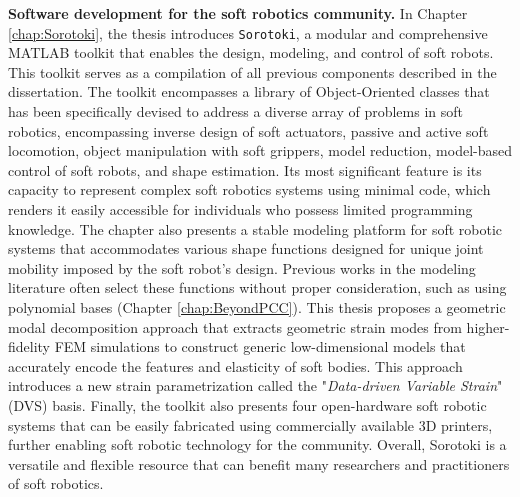 \textbf{Software development for the soft robotics community.} In Chapter \ref{chap:Sorotoki}, the thesis introduces \texttt{Sorotoki}, a modular and comprehensive MATLAB\textsuperscript{\scriptsize\textregistered} toolkit that enables the design, modeling, and control of soft robots. This toolkit serves as a compilation of all previous components described in the dissertation. The toolkit encompasses a library of Object-Oriented classes that has been specifically devised to address a diverse array of problems in soft robotics, encompassing inverse design of soft actuators, passive and active soft locomotion, object manipulation with soft grippers, model reduction, model-based control of soft robots, and shape estimation. Its most significant feature is its capacity to represent complex soft robotics systems using minimal code, which renders it easily accessible for individuals who possess limited programming knowledge. The chapter also presents a stable modeling platform for soft robotic systems that accommodates various shape functions designed for unique joint mobility imposed by the soft robot's design. Previous works in the modeling literature often select these functions without proper consideration, such as using polynomial bases (Chapter \ref{chap:BeyondPCC}). This thesis proposes a geometric modal decomposition approach that extracts geometric strain modes from higher-fidelity FEM simulations to construct generic low-dimensional models that accurately encode the features and elasticity of soft bodies. This approach introduces a new strain parametrization called the "\textit{Data-driven Variable Strain}" (DVS) basis. Finally, the toolkit also presents four open-hardware soft robotic systems that can be easily fabricated using commercially available 3D printers, further enabling soft robotic technology for the community. Overall, Sorotoki is a versatile and flexible resource that can benefit many researchers and practitioners of soft robotics.

